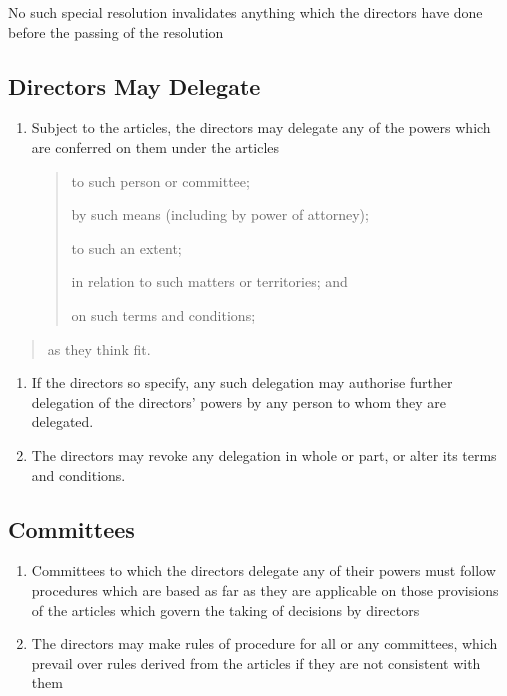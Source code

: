 \documentclass[letterpaper,10pt,english]{sphinxmanual}
\begin{document}
 No such special resolution invalidates anything which the directors have done before the passing of the resolution


\subsection{Directors May Delegate}
\label{\detokenize{content:directors-may-delegate}}\begin{enumerate}
\def\theenumi{\arabic{enumi}}
\def\labelenumi{\theenumi .}
\makeatletter\def\p@enumii{\p@enumi \theenumi .}\makeatother
\item {} 
Subject to the articles, the directors may delegate any of the powers which are conferred on them under the articles
\begin{quote}

 to such person or committee;

 by such means (including by power of attorney);

 to such an extent;

 in relation to such matters or territories; and

 on such terms and conditions;
\end{quote}

\end{enumerate}
\begin{quote}

as they think fit.
\end{quote}
\begin{enumerate}
\def\theenumi{\arabic{enumi}}
\def\labelenumi{\theenumi .}
\makeatletter\def\p@enumii{\p@enumi \theenumi .}\makeatother
\item {} 
If the directors so specify, any such delegation may authorise further delegation of the directors’ powers by any person to whom they are delegated.

\item {} 
The directors may revoke any delegation in whole or part, or alter its terms and conditions.

\end{enumerate}


\subsection{Committees}
\label{\detokenize{content:committees}}\begin{enumerate}
\def\theenumi{\alph{enumi}}
\def\labelenumi{\theenumi )}
\makeatletter\def\p@enumii{\p@enumi \theenumi )}\makeatother
\item {} 
Committees to which the directors delegate any of their powers must follow procedures which are based as far as they are applicable on those provisions of the articles which govern the taking of decisions by directors

\item {} 
The directors may make rules of procedure for all or any committees, which prevail over rules derived from the articles if they are not consistent with them

\end{enumerate}
\end{document}
